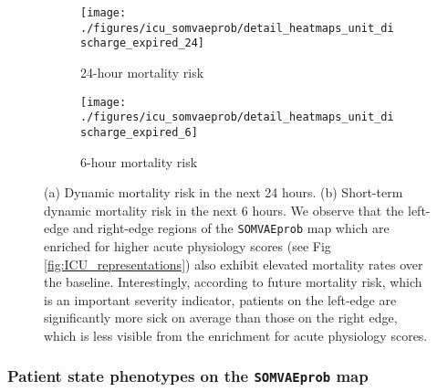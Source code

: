 \documentclass{article}
\begin{document}
\begin{figure}[h!]
\centering
\begin{subfigure}[t]{0.47\textwidth}
\centering
\texttt{[image: ./figures/icu\_somvaeprob/detail\_heatmaps\_unit\_discharge\_expired\_24]}
\caption{24-hour mortality risk}
\end{subfigure}
\begin{subfigure}[t]{0.47\textwidth}
\centering
\texttt{[image: ./figures/icu\_somvaeprob/detail\_heatmaps\_unit\_discharge\_expired\_6]}
\caption{6-hour mortality risk}
\end{subfigure}
\caption{(a) Dynamic mortality risk in the next 24 hours. (b) Short-term dynamic mortality risk in the next
             6 hours. We observe that the left-edge and right-edge regions of the \texttt{SOMVAEprob} map which
             are enriched for higher acute physiology scores (see Fig \ref{fig:ICU_representations}) also exhibit elevated 
             mortality rates over the baseline. Interestingly, according to future mortality risk, which is an important severity indicator,
             patients on the left-edge are significantly more sick on average than those on the right edge, which is
             less visible from the enrichment for acute physiology scores.}
\end{figure}

\newpage



\subsubsection*{Patient state phenotypes on the \texttt{SOMVAEprob} map}
\end{document}
